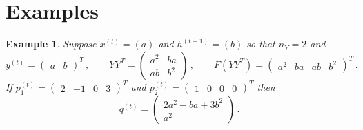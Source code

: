 \documentclass[english,letter paper,12pt,leqno]{article}
\theoremstyle{example}
\newtheorem{example}[theorem]{Example}
\numberwithin{equation}{section}
\begin{document}
\newpage

\section{Examples}

\begin{example} Suppose $x^{(t)} = ( a )$ and $h^{(t-1)} = ( b )$ so that $n_Y = 2$ and
\[
y^{(t)} = \begin{pmatrix} a & b \end{pmatrix}^T\,, \qquad Y Y^T = \begin{pmatrix} a^2 & ba \\ ab & b^2 \end{pmatrix}\,, \qquad F( Y Y^T ) = \begin{pmatrix} a^2 & ba & ab & b^2 \end{pmatrix}^T\,.
\]
If $p^{(t)}_1 = \begin{pmatrix} 2 & -1 & 0 & 3 \end{pmatrix}^T$ and $p^{(t)}_2 = \begin{pmatrix} 1 & 0 & 0 & 0 \end{pmatrix}^T$ then
\[
q^{(t)} = \begin{pmatrix} 2a^2 - ba + 3b^2 \\ a^2 \end{pmatrix}\,.
\]
\end{example}
\end{document}
